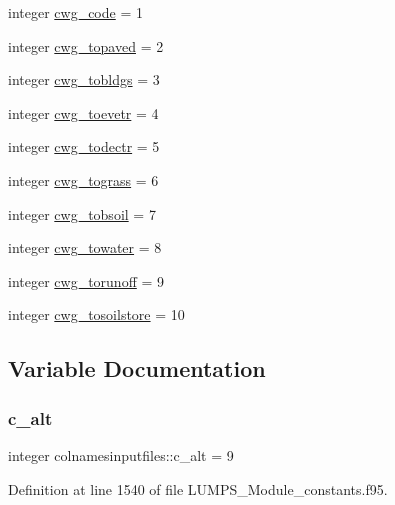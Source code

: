 \begin{DoxyCompactItemize}
\item 
integer \hyperlink{namespacecolnamesinputfiles_a64bfff0bf57d14dd835e873f6f3167d8}{cwg\+\_\+code} = 1
\item 
integer \hyperlink{namespacecolnamesinputfiles_a2dd0d1d55401afccfbcce4af42d45dc6}{cwg\+\_\+topaved} = 2
\item 
integer \hyperlink{namespacecolnamesinputfiles_ae40f13debc20fc4d369d7be6089d29fe}{cwg\+\_\+tobldgs} = 3
\item 
integer \hyperlink{namespacecolnamesinputfiles_adef6bd71d6aaf94c2fbcfd4759cd10cc}{cwg\+\_\+toevetr} = 4
\item 
integer \hyperlink{namespacecolnamesinputfiles_a078d0b487d6d85f408d287eaaafad86e}{cwg\+\_\+todectr} = 5
\item 
integer \hyperlink{namespacecolnamesinputfiles_a26de107a7c31bec02c878c95fa12afaf}{cwg\+\_\+tograss} = 6
\item 
integer \hyperlink{namespacecolnamesinputfiles_ad640d67e5e4caa9de24c0a8f1dd14823}{cwg\+\_\+tobsoil} = 7
\item 
integer \hyperlink{namespacecolnamesinputfiles_a5d8e3bc52b4085fc02c87b72863097fc}{cwg\+\_\+towater} = 8
\item 
integer \hyperlink{namespacecolnamesinputfiles_acc2373562aba09ce4159c84e13cffde9}{cwg\+\_\+torunoff} = 9
\item 
integer \hyperlink{namespacecolnamesinputfiles_a00e15e85f40dc69c021c7686e37a496a}{cwg\+\_\+tosoilstore} = 10
\end{DoxyCompactItemize}


\subsection{Variable Documentation}
\mbox{\label{namespacecolnamesinputfiles_adebe514d38a358892ea83a34e671956b}} 
\subsubsection{\texorpdfstring{c\+\_\+alt}{c\_alt}}
{\footnotesize\ttfamily integer colnamesinputfiles\+::c\+\_\+alt = 9}



Definition at line 1540 of file L\+U\+M\+P\+S\+\_\+\+Module\+\_\+constants.\+f95.

